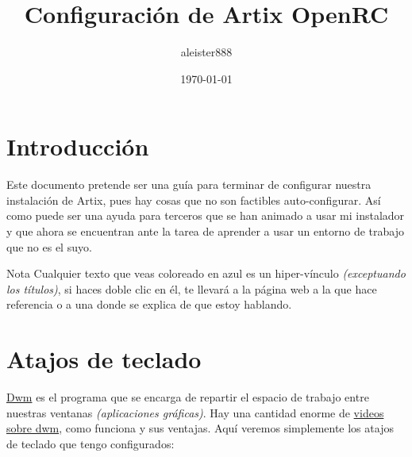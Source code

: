 \documentclass[12pt]{article}
\title{\textcolor{myblue}{\bfseries Configuración de Artix OpenRC}} %
\date{\today} %
\author{aleister888}
\begin{document}
\maketitle

\section{Introducción}

Este documento pretende ser una guía para terminar de configurar nuestra instalación de Artix, pues hay cosas que no son factibles auto-configurar. Así como puede ser una ayuda para terceros que se han animado a usar mi instalador y que ahora se encuentran ante la tarea de aprender a usar un entorno de trabajo que no es el suyo.

\begin{mybox}{Nota}
Cualquier texto que veas coloreado en azul es un hiper-vínculo \emph{(exceptuando los títulos)}, si haces doble clic en él, te llevará a la página web a la que hace referencia o a una donde se explica de que estoy hablando.
\end{mybox}

\section{Atajos de teclado}

\href{https://dwm.suckless.org}{Dwm} es el programa que se encarga de repartir el espacio de trabajo entre nuestras ventanas \emph{(aplicaciones gráficas)}. Hay una cantidad enorme de \href{https://www.youtube.com/results?search_query=dwm}{videos sobre dwm}, como funciona y sus ventajas. Aquí veremos simplemente los atajos de teclado que tengo configurados:
\end{document}
